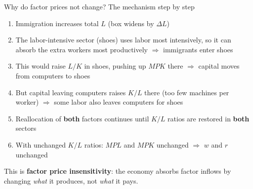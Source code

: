 \documentclass{beamer}
\begin{document}
\begin{frame}{Why do factor prices not change? The mechanism step by step}

\begin{enumerate}
    \item Immigration increases total $L$ (box widens by $\Delta L$)

    \vspace{0.1cm}

    \item The labor-intensive sector (shoes) uses labor most intensively, so it can absorb the extra workers most productively $\Rightarrow$ immigrants enter shoes

    \vspace{0.1cm}

    \item This would raise $L/K$ in shoes, pushing up $MPK$ there $\Rightarrow$ capital moves from computers to shoes

    \vspace{0.1cm}

    \item But capital leaving computers raises $K/L$ there (too few machines per worker) $\Rightarrow$ some labor also leaves computers for shoes

    \vspace{0.1cm}

    \item Reallocation of \textbf{both} factors continues until $K/L$ ratios are restored in \textbf{both} sectors

    \vspace{0.1cm}

    \item With unchanged $K/L$ ratios: $MPL$ and $MPK$ unchanged $\Rightarrow$ $w$ and $r$ unchanged

\end{enumerate}

\vspace{0.3cm}

This is \textbf{factor price insensitivity}: the economy absorbs factor inflows by changing \textit{what} it produces, not \textit{what} it pays.

\end{frame}
\fi


\end{document}
